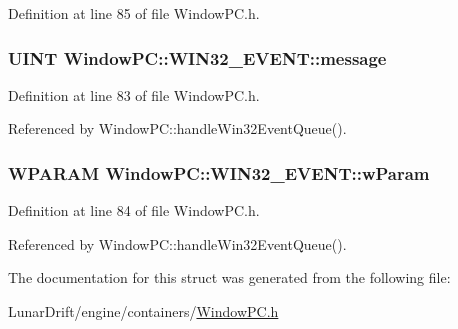 Definition at line 85 of file Window\+P\+C.\+h.

\subsubsection[{\texorpdfstring{message}{message}}]{\setlength{\rightskip}{0pt plus 5cm}U\+I\+NT Window\+P\+C\+::\+W\+I\+N32\+\_\+\+E\+V\+E\+N\+T\+::message}\hypertarget{struct_window_p_c_1_1_w_i_n32___e_v_e_n_t_a2e5b34b5b59137ceedfcbf252695f146}{}\label{struct_window_p_c_1_1_w_i_n32___e_v_e_n_t_a2e5b34b5b59137ceedfcbf252695f146}


Definition at line 83 of file Window\+P\+C.\+h.



Referenced by Window\+P\+C\+::handle\+Win32\+Event\+Queue().

\subsubsection[{\texorpdfstring{w\+Param}{wParam}}]{\setlength{\rightskip}{0pt plus 5cm}W\+P\+A\+R\+AM Window\+P\+C\+::\+W\+I\+N32\+\_\+\+E\+V\+E\+N\+T\+::w\+Param}\hypertarget{struct_window_p_c_1_1_w_i_n32___e_v_e_n_t_ac895aec4d3d1953b85923f0a5da45004}{}\label{struct_window_p_c_1_1_w_i_n32___e_v_e_n_t_ac895aec4d3d1953b85923f0a5da45004}


Definition at line 84 of file Window\+P\+C.\+h.



Referenced by Window\+P\+C\+::handle\+Win32\+Event\+Queue().



The documentation for this struct was generated from the following file\+:\begin{DoxyCompactItemize}
\item 
Lunar\+Drift/engine/containers/\hyperlink{_window_p_c_8h}{Window\+P\+C.\+h}\end{DoxyCompactItemize}
